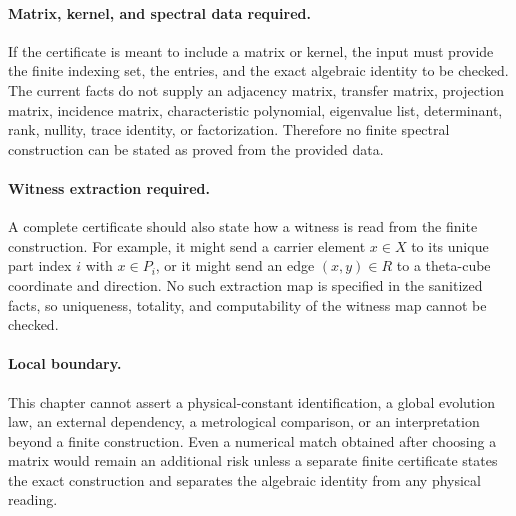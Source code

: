 \paragraph{Matrix, kernel, and spectral data required.}
If the certificate is meant to include a matrix or kernel, the input must provide the finite indexing set, the entries, and the exact algebraic identity to be checked. The current facts do not supply an adjacency matrix, transfer matrix, projection matrix, incidence matrix, characteristic polynomial, eigenvalue list, determinant, rank, nullity, trace identity, or factorization. Therefore no finite spectral construction can be stated as proved from the provided data.

\paragraph{Witness extraction required.}
A complete certificate should also state how a witness is read from the finite construction. For example, it might send a carrier element $x\in X$ to its unique part index $i$ with $x\in P_i$, or it might send an edge $(x,y)\in R$ to a theta-cube coordinate and direction. No such extraction map is specified in the sanitized facts, so uniqueness, totality, and computability of the witness map cannot be checked.

\paragraph{Local boundary.}
This chapter cannot assert a physical-constant identification, a global evolution law, an external dependency, a metrological comparison, or an interpretation beyond a finite construction. Even a numerical match obtained after choosing a matrix would remain an additional risk unless a separate finite certificate states the exact construction and separates the algebraic identity from any physical reading.